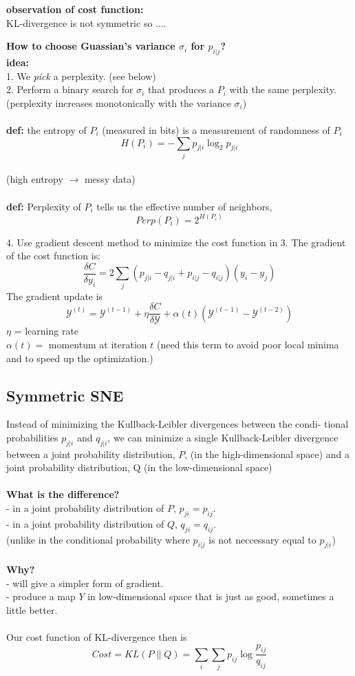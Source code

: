 \documentclass[runningheads]{llncs}
\begin{document}
		\textbf{observation of cost function:}\\
		KL-divergence is not symmetric so ....\\
		\begin{mdframed}
		\textbf{How to choose Guassian's variance $\sigma_i$ for $p_{i|j}$?}\\
		\textbf{idea:} 
		\\
		1. We \emph{pick} a perplexity. (see below)\\
		2. Perform a binary search for $\sigma_i$ that produces a $P_i$ with the same perplexity. (perplexity increases monotonically with the variance $\sigma_i$)\\
		\\
		\textbf{def:} the entropy of $P_i$ (measured in bits) is a measurement of randomness of $P_i$
		$$H(P_i) = -\sum_{j} p_{j | i} \log _{2} p_{j | i}$$
		\\
		(high entropy $\rightarrow$ messy data)\\
		\\
		\textbf{def:} Perplexity of $P_i$ tells us the effective number of neighbors,
		$$Perp(P_i) = 2^{H(P_i)}$$
		\end{mdframed}
	4. Use gradient descent method to minimize the cost function in 3. The gradient of the cost function is:
	$$\frac{\delta C}{\delta y_{i}}=2 \sum_{j}\left(p_{j | i}-q_{j | i}+p_{i | j}-q_{i | j}\right)\left(y_{i}-y_{j}\right)$$
	The gradient update is 
	$$\mathcal{Y}^{(t)}=\mathcal{Y}^{(t-1)}+\eta \frac{\delta C}{\delta \mathcal{Y}}+\alpha(t)\left(\mathcal{Y}^{(t-1)}-\mathcal{Y}^{(t-2)}\right)$$
	$\eta$ = learning rate\\
	$\alpha(t) =$ momentum at iteration $t$ (need this term to avoid poor local minima and to speed up the optimization.)
	\subsection{   Symmetric SNE}
	Instead of minimizing the Kullback-Leibler divergences between the condi- tional probabilities $p_{j|i}$ and $q_{j|i}$, we can minimize a single Kullback-Leibler divergence between a joint probability distribution, $P$, (in the high-dimensional space) and a joint probability distribution, Q (in the low-dimensional space)\\
	\\
	\textbf{What is the difference?}\\
	- in a joint probability distribution of $P$, $p_{ji} = p_{ij}$.\\
	- in a joint probability distribution of $Q$, $q_{ji} = q_{ij}$.\\
	(unlike in the conditional probability where $p_{i|j}$ is not neccessary equal to $p_{j|i}$)\\
	\\
	\textbf{Why?} \\
	- will give a simpler form of gradient.\\
	- produce a map $Y$ in low-dimensional space that is just as good, sometimes a little better.\\
	\\
	Our cost function of KL-divergence then is
	$$Cost=K L(P \| Q)=\sum_{i} \sum_{j} p_{i j} \log \frac{p_{i j}}{q_{i j}}$$
\end{document}
